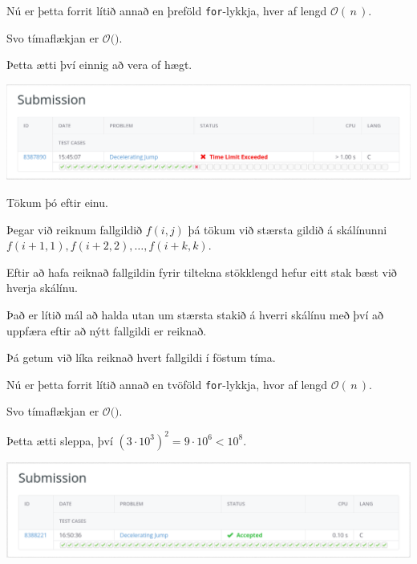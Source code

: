 {
}

{
	{
		\item<1-> Nú er þetta forrit lítið annað en þreföld \texttt{for}-lykkja, hver af lengd $\mathcal{O}(\,n\,)$.
		\item<2-> Svo tímaflækjan er $\mathcal{O}($\onslide<3->{$n^3$}$)$.
		\item<4-> Þetta ætti því einnig að vera of hægt.
		\item<5->[] \includegraphics[scale = 0.25]{fig/tle2.png}
		\item<6-> Tökum þó eftir einu.
	}
}

{
	{
		\item<1-> Þegar við reiknum fallgildið $f(i, j)$ þá tökum við stærsta gildið á skálínunni $f(i + 1, 1), f(i + 2, 2), \dots, f(i + k, k)$.
		\item<2-> Eftir að hafa reiknað fallgildin fyrir tiltekna stökklengd hefur eitt stak bæst við hverja skálínu.
		\item<3-> Það er lítið mál að halda utan um stærsta stakið á hverri skálínu með því að uppfæra eftir að nýtt fallgildi er reiknað.
		\item<4-> Þá getum við líka reiknað hvert fallgildi í föstum tíma.
	}
}

{
}

{
	{
		\item<1-> Nú er þetta forrit lítið annað en tvöföld \texttt{for}-lykkja, hvor af lengd $\mathcal{O}(\,n\,)$.
		\item<2-> Svo tímaflækjan er $\mathcal{O}($\onslide<3->{$n^2$}$)$.
		\item<4-> Þetta ætti sleppa, því $(3 \cdot 10^3)^2 = 9 \cdot 10^6 < 10^8$.
		\item<5->[] \includegraphics[scale = 0.25]{fig/ac.png}
	}
}

{
}


